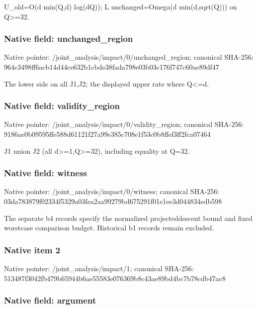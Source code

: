 \documentclass[10pt,a4paper]{article}
\begin{document}
U\_old=O(d min(Q,d) log(dQ)); L unchanged=Omega(d min(d,sqrt(Q))) on Q>=32.


\subsubsection{Native field: unchanged\_region}


Native pointer: /joint\_analysis/impact/0\allowbreak{}/unchanged\_region; canonical SHA-256: 964c3498ff6acb14d44ce632\allowbreak{}b1cbde38fada798e03b03c17\allowbreak{}6f747c60ae89df47


The lower side on all J1,J2; the displayed upper rate where Q<=d.


\subsubsection{Native field: validity\_region}


Native pointer: /joint\_analysis/impact/0\allowbreak{}/validity\_region; canonical SHA-256: 9186ae0b09595ffe588d6112\allowbreak{}1f27a99e385c708e1f53c0b8\allowbreak{}ffef3ff2fca07464


J1 union J2 (all d>=1,Q>=32), including equality at Q=32.


\subsubsection{Native field: witness}


Native pointer: /joint\_analysis/impact/0/witness; canonical SHA-256: 03da783879f02334f5329a03\allowbreak{}fea2aa99279bd675291f01e1\allowbreak{}ee3d044834edb598


The separate b4 records specify the normalized projecteddescent bound and fixed worstcase comparison budget. Historical b1 records remain excluded.


\subsubsection{Native item 2}


Native pointer: /joint\_analysis/impact/1; canonical SHA-256: 513487f3042fb479b65944b6\allowbreak{}ae55583e076369b8c43ae89b\allowbreak{}d4bc7b78cdb47ac8



\subsubsection{Native field: argument}
\end{document}
